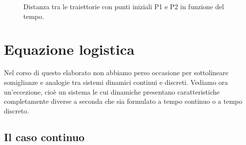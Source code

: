 \begin{figure}[tbp]
\centering
{}
\caption{Distanza tra le traiettorie con punti iniziali P1 e P2 in funzione del tempo.}
\label{fig:lorenz-errore}
\end{figure}

\section{Equazione logistica}

Nel corso di questo elaborato non abbiamo perso occasione per sottolineare
somiglianze e analogie tra sistemi dinamici continui e discreti.
Vediamo ora un'eccezione, cioè un sistema le cui dinamiche presentano
caratteristiche completamente diverse a seconda che sia formulato a tempo
continuo o a tempo discreto.

\subsection*{Il caso continuo}

